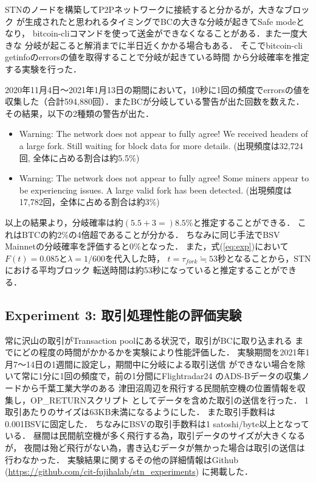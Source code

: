 \documentclass[graybox]{svmult}
\begin{document}
STNのノードを構築してP2Pネットワークに接続すると分かるが，大きなブロック
が生成されたと思われるタイミングでBCの大きな分岐が起きてSafe modeとなり，
bitcoin-cliコマンドを使って送金ができなくなることがある．また一度大きな
分岐が起こると解消までに半日近くかかる場合もある．
そこでbitcoin-cli getinfoのerrorsの値を取得することで分岐が起きている時間
から分岐確率を推定する実験を行った．

2020年11月4日〜2021年1月13日の期間において，10秒に1回の頻度でerrorsの値を
収集した（合計594,880回）．またBCが分岐している警告が出た回数を数えた．
その結果，以下の2種類の警告が出た．
%
\begin{itemize}
  \item Warning: The network does not appear to fully agree! We received
        headers of a large fork. Still waiting for block data for more details.
	(出現頻度は32,724回, 全体に占める割合は約5.5\%)

  \item Warning: The network does not appear to fully agree! Some miners
        appear to be experiencing issues. A large valid fork has been detected. 
	(出現頻度は17,782回，全体に占める割合は約3\%)
\end{itemize}
%
以上の結果より，分岐確率は約$(5.5+3=)8.5$\%と推定することができる．
これはBTCの約2\%の4倍超であることが分かる．
ちなみに同じ手法でBSV Mainnetの分岐確率を評価すると0\%となった．
また，式(\ref{eq:exp})において$F(t)=0.085$と$\lambda=1/600$を代入した時，
$t=\tau_{fork} \fallingdotseq 53$秒となることから，STNにおける平均ブロック
転送時間は約53秒になっていると推定することができる．









\subsection{Experiment 3: 取引処理性能の評価実験}
\label{sec:method}

常に沢山の取引がTransaction poolにある状況で，取引がBCに取り込まれる
までにどの程度の時間がかかるかを実験により性能評価した．
実験期間を2021年1月7〜14日の1週間に設定し，期間中に分岐による取引送信
ができない場合を除いて常に1分に1回の頻度で，前の1分間にFlightradar24 
\cite{flightradar24} のADS-Bデータの収集ノードから千葉工業大学のある
津田沼周辺を飛行する民間航空機の位置情報を収集し，OP\_RETURNスクリプト
としてデータを含めた取引の送信を行った．
1取引あたりのサイズは63KB未満になるようにした．
また取引手数料は0.001BSVに固定した．
ちなみにBSVの取引手数料は1 satoshi/byte以上となっている．
昼間は民間航空機が多く飛行する為，取引データのサイズが大きくなるが，
夜間は殆ど飛行がない為，書き込むデータが無かった場合は取引の送信は
行わなかった．
実験結果に関するその他の詳細情報はGithub 
(\url{https://github.com/cit-fujihalab/stn_experiments})
に掲載した．
\end{document}
